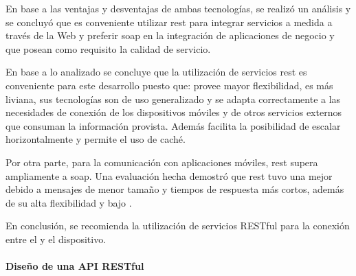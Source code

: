 En base a las ventajas y desventajas de ambas tecnologías, se realizó un análisis\cite[p.~809]{pautasso2008restful} y se concluyó que es conveniente utilizar \gls{rest} para integrar servicios a medida a través de la Web y preferir \gls{soap} en la integración de aplicaciones de negocio y que posean como requisito la calidad de servicio.

En base a lo analizado se concluye que la utilización de servicios \gls{rest} es conveniente para este desarrollo puesto que: provee mayor flexibilidad, es más liviana, sus tecnologías son de uso generalizado y se adapta correctamente a las necesidades de conexión de los dispositivos móviles y de otros servicios externos que consuman la información provista. Además facilita la posibilidad de escalar horizontalmente y permite el uso de caché.

Por otra parte, para la comunicación con aplicaciones móviles, \gls{rest} supera ampliamente a \gls{soap}. Una evaluación hecha\cite{hamad2010performance} demostró que \gls{rest} tuvo una mejor  debido a mensajes de menor tamaño y tiempos de respuesta más cortos, además de su alta flexibilidad y bajo . 

En conclusión, se recomienda la utilización de servicios RESTful\cite{hamad2010performance} para la conexión entre el  y el dispositivo.

\paragraph{Diseño de una API RESTful}
\label{caracteristicas_api_restful}

